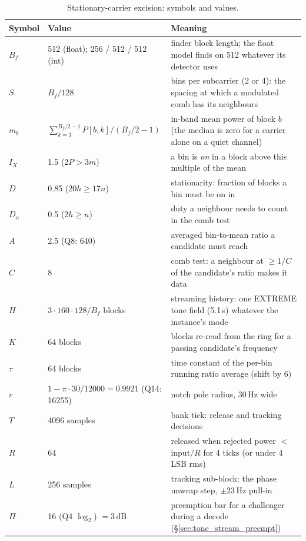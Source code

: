 \begin{table}[H]
    \centering
    \caption{Stationary-carrier excision: symbols and values.}
    \label{tab:excision_sym}
    \small
    \begin{tabular}{@{}lp{3.4cm}p{8.4cm}@{}}
    \toprule
    \textbf{Symbol} & \textbf{Value} & \textbf{Meaning} \\
    \midrule
    $B_f$ & 512 (float); 256 / 512 / 512 (int) & finder block length; the float model finds on 512 whatever its detector uses \\
    $S$ & $B_f / 128$ & bins per subcarrier (2 or 4): the spacing at which a modulated comb has its neighbours \\
    $m_b$ & $\sum_{k=1}^{B_f/2-1} P[b,k] / (B_f/2 - 1)$ & in-band mean power of block $b$ (the median is zero for a carrier alone on a quiet channel) \\
    $I_X$ & 1.5 ($2P > 3m$) & a bin is \emph{on} in a block above this multiple of the mean \\
    $D$ & 0.85 ($20h \ge 17n$) & stationarity: fraction of blocks a bin must be on in \\
    $D_n$ & 0.5 ($2h \ge n$) & duty a neighbour needs to count in the comb test \\
    $A$ & 2.5 (Q8: 640) & averaged bin-to-mean ratio a candidate must reach \\
    $C$ & 8 & comb test: a neighbour at $\ge 1/C$ of the candidate's ratio makes it data \\
    $H$ & $3 \cdot 160 \cdot 128 / B_f$ blocks & streaming history: one EXTREME tone field (5.1\,s) whatever the instance's mode \\
    $K$ & 64 blocks & blocks re-read from the ring for a passing candidate's frequency \\
    $\tau$ & 64 blocks & time constant of the per-bin running ratio average (shift by 6) \\
    $r$ & $1 - \pi \cdot 30 / 12000 = 0.9921$ (Q14: 16255) & notch pole radius, 30\,Hz wide \\
    $T$ & 4096 samples & bank tick: release and tracking decisions \\
    $R$ & 64 & released when rejected power $< $ input$/R$ for 4 ticks (or under 4\,LSB rms) \\
    $L$ & 256 samples & tracking sub-block: the phase unwrap step, $\pm 23$\,Hz pull-in \\
    $\Pi$ & 16 (Q4 $\log_2$) $= 3$\,dB & preemption bar for a challenger during a decode (\S\ref{sec:tone_stream_preempt}) \\
    \bottomrule
    \end{tabular}
\end{table}

